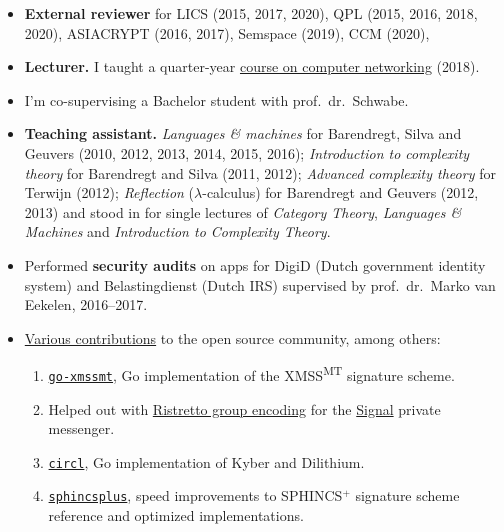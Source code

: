 \documentclass{article}
\newcommand\partitle[1]{\vskip20pt\par\noindent{\textsf{\textbf{#1}}}}
\begin{document}
\partitle{Other relevant experience}
\begin{itemize}
    \item \textbf{External reviewer}
            for LICS (2015, 2017, 2020), QPL (2015, 2016, 2018, 2020),
            ASIACRYPT (2016, 2017), Semspace (2019), CCM (2020),
    \item \textbf{Lecturer.}
        I taught a quarter-year
            \href{https://www.ru.nl/studiegids/science/vm/osirislinks/ibc/nwi-ibc021/}{course on computer networking} (2018).
    \item I'm co-supervising a Bachelor student with prof.~dr.~Schwabe.
    \item \textbf{Teaching assistant.}
        \emph{Languages \& machines} for Barendregt, Silva and Geuvers
        (2010, 2012, 2013, 2014, 2015, 2016);
        \emph{Introduction to complexity theory}
        for Barendregt and Silva (2011, 2012);
        \emph{Advanced complexity theory}
        for Terwijn (2012);
        \emph{Reflection} ($\lambda$-calculus) for Barendregt and Geuvers
        (2012, 2013) and stood in for single lectures
        of \emph{Category Theory}, \emph{Languages \& Machines}
        and \emph{Introduction to Complexity Theory}.
    \item Performed \textbf{security audits}
        on apps for DigiD (Dutch government identity system)
        and Belastingdienst (Dutch IRS) supervised by prof.~dr.~Marko van Eekelen,
        2016--2017.
    \item \href{https://github.com/bwesterb}{Various contributions} to the open source community, among others:
        \begin{enumerate}
            \item \href{https://github.com/bwesterb/go-xmssmt}{\texttt{go-xmssmt}}, Go implementation of the XMSS\textsuperscript{MT}
                        signature scheme.
                \item Helped out with
        \href{https://github.com/signalapp/curve25519-dalek/commit/c2320e9137ab1d02234620ed4f3b22371f688db2}{Ristretto
                    group encoding} for the \href{https://signal.org/en/}{Signal} private messenger.
            \item \href{https://github.com/cloudflare/circl}{\texttt{circl}}, Go implementation of
                    Kyber and Dilithium.
            \item \href{https://github.com/sphincs/sphincsplus}{\texttt{sphincsplus}},
                    speed improvements to SPHINCS$^+$ signature scheme reference and optimized implementations.

\end{enumerate}
\end{itemize}
\end{document}
